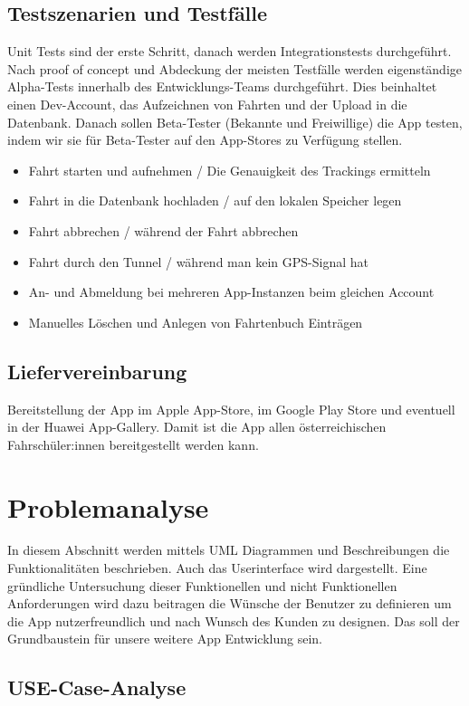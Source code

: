 \subsection{Testszenarien und Testfälle}

Unit Tests sind der erste Schritt, danach werden Integrationstests durchgeführt. Nach proof of concept und Abdeckung der meisten Testfälle werden eigenständige Alpha-Tests innerhalb des Entwicklungs-Teams durchgeführt. Dies beinhaltet einen Dev-Account, das Aufzeichnen von Fahrten und der Upload in die Datenbank. Danach sollen Beta-Tester (Bekannte und Freiwillige) die App testen, indem wir sie für Beta-Tester auf den App-Stores zu Verfügung stellen.
\begin{itemize}
	\item Fahrt starten und aufnehmen / Die Genauigkeit des Trackings ermitteln
	\item Fahrt in die Datenbank hochladen / auf den lokalen Speicher legen
	\item Fahrt abbrechen / während der Fahrt abbrechen
	\item Fahrt durch den Tunnel / während man kein GPS-Signal hat
	\item An- und Abmeldung bei mehreren App-Instanzen beim gleichen Account
	\item Manuelles Löschen und Anlegen von Fahrtenbuch Einträgen
\end{itemize}
\subsection{Liefervereinbarung}
Bereitstellung der App im Apple App-Store, im Google Play Store und eventuell in der Huawei App-Gallery. Damit ist die App allen österreichischen Fahrschüler:innen bereitgestellt werden kann.

\section{Problemanalyse}
\label{sec:problemanalyse}
In diesem Abschnitt werden mittels UML Diagrammen und Beschreibungen die Funktionalitäten beschrieben. Auch das Userinterface wird dargestellt. Eine gründliche Untersuchung dieser Funktionellen und nicht Funktionellen Anforderungen wird dazu beitragen die Wünsche der Benutzer zu definieren um die App nutzerfreundlich und nach Wunsch des Kunden zu designen. Das soll der Grundbaustein für unsere weitere App Entwicklung sein.

\subsection{USE-Case-Analyse}

